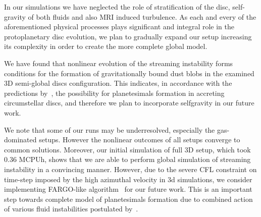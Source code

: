 \par In our simulations we have neglected the role of stratification of the
disc, self-gravity of both fluids and also MRI induced turbulence. As each and
every of the aforementioned physical processes plays significant and integral
role in the protoplanetary disc evolution, we plan to gradually expand our setup
increasing its complexity in order to create the more complete global model.

\par We have found that nonlinear evolution of  the streaming instability forms
conditions for the formation  of gravitationally bound dust blobs in the
examined 3D semi-global discs configuration.  This indicates, in accordance with
the predictions by~\citet{J07}, the possibility  for  planetesimals formation in
accreting circumstellar discs,  and therefore we plan to incorporate selfgravity
in our future work.

\par We note that some of our runs may be underresolved, especially the
gas-dominated setups. However the nonlinear outcomes of all setups converge to
common solutions. Moreover, our initial simulation of full 3D setup, which took
0.36 MCPUh, shows that we are able to perform global simulation of streaming
instability in a convincing manner. 
However, due to the severe CFL constraint on time-step imposed by the high
azimuthal velocity in 3d simulations, we consider implementing {\sc FARGO}-like
algorithm~\cite{M00} for our future work.
This is an important step towards complete model of planetesimals formation due
to combined action of various fluid instabilities postulated by~\citet{J07}. 

